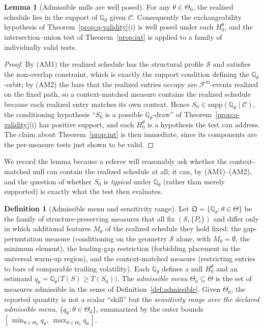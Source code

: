 \documentclass[preprint,12pt]{elsarticle}
\theoremstyle{definition}
\newtheorem{lemma}[theorem]{Lemma}
\newtheorem{definition}{Definition}
\begin{document}
\begin{lemma}[Admissible nulls are well posed]
\label{lem:admissible-validity}
For any $\theta\in\Theta_0$, the realized schedule lies in the support of
$\mathbb{Q}_\theta$ given $\mathcal C$. Consequently the exchangeability hypothesis
of Theorem~\ref{prop:q-validity}(i) is well posed under each $H_0^\theta$, and the
intersection--union test of Theorem~\ref{prop:iut} is applied to a family of
individually valid tests.
\end{lemma}

\begin{proof}
By (AM1) the realized schedule has the structural profile $\mathcal S$ and satisfies
the non-overlap constraint, which is exactly the support condition defining the
$\mathbb{Q}_\theta$-orbit; by (AM2) the bars that the realized entries occupy are
$\mathcal F^{\mathrm{in}}$-events realized on the fixed path, so a context-matched
measure contains the realized schedule because each realized entry matches its own
context. Hence $S_0\in\mathrm{supp}(\mathbb{Q}_\theta\mid\mathcal C)$, the
conditioning hypothesis ``$S_0$ is a possible $\mathbb{Q}_\theta$-draw'' of
Theorem~\ref{prop:q-validity}(i) has positive support, and each $H_0^\theta$ is a
hypothesis the test can address. The claim about Theorem~\ref{prop:iut} is then
immediate, since its components are the per-measure tests just shown to be valid.
\end{proof}

We record the lemma because a referee will reasonably ask whether the
context-matched null can contain the realized schedule at all; it can, by (AM1)--(AM2),
and the question of whether $S_0$ is \emph{typical} under $\mathbb{Q}_\theta$ (rather
than merely supported) is exactly what the test then evaluates.

\begin{definition}[Admissible menu and sensitivity range]
\label{def:measure-family}
Let $\mathfrak Q=\{\mathbb{Q}_\theta:\theta\in\Theta\}$ be the family of
structure-preserving measures that all fix $(\mathcal S,\{P_t\})$ and differ only
in which additional features $M_\theta$ of the realized schedule they hold fixed:
the gap-permutation measure (conditioning on the geometry $\mathcal S$ alone, with
$M_\theta=\emptyset$, the minimum element), the leading-gap restriction (forbidding
placement in the universal warm-up region), and the context-matched measure
(restricting entries to bars of comparable trailing volatility). Each
$\mathbb{Q}_\theta$ defines a null $H_0^\theta$ and an estimand
$q_\theta=\mathbb{Q}_\theta\big(T(S)\ge T(S_0)\big)$. The \emph{admissible menu}
$\Theta_0\subseteq\Theta$ is the set of measures admissible in the sense of
Definition~\ref{def:admissible}. Given $\Theta_0$, the reported quantity is not a
scalar ``skill'' but the \emph{sensitivity range over the declared admissible
menu}, $\{q_\theta:\theta\in\Theta_0\}$, summarized by the outer bounds
$[\,\min_{\theta\in\Theta_0}q_\theta,\ \max_{\theta\in\Theta_0}q_\theta\,]$.
\end{definition}
\end{document}
